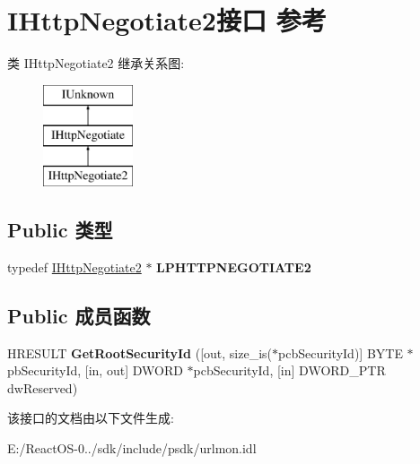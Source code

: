 \hypertarget{interface_i_http_negotiate2}{}\section{I\+Http\+Negotiate2接口 参考}
\label{interface_i_http_negotiate2}
类 I\+Http\+Negotiate2 继承关系图\+:\begin{figure}[H]
\begin{center}
\leavevmode
\includegraphics[height=3.000000cm]{interface_i_http_negotiate2}
\end{center}
\end{figure}
\subsection*{Public 类型}
\begin{DoxyCompactItemize}
\item 
\mbox{\label{interface_i_http_negotiate2_acd8bc7794efcb0cfc7467b2e1ddb85df}} 
typedef \hyperlink{interface_i_http_negotiate2}{I\+Http\+Negotiate2} $\ast$ {\bfseries L\+P\+H\+T\+T\+P\+N\+E\+G\+O\+T\+I\+A\+T\+E2}
\end{DoxyCompactItemize}
\subsection*{Public 成员函数}
\begin{DoxyCompactItemize}
\item 
\mbox{\label{interface_i_http_negotiate2_a1e20bc1021805613698332c745bde5eb}} 
H\+R\+E\+S\+U\+LT {\bfseries Get\+Root\+Security\+Id} (\mbox{[}out, size\+\_\+is($\ast$pcb\+Security\+Id)\mbox{]} B\+Y\+TE $\ast$pb\+Security\+Id, \mbox{[}in, out\mbox{]} D\+W\+O\+RD $\ast$pcb\+Security\+Id, \mbox{[}in\mbox{]} D\+W\+O\+R\+D\+\_\+\+P\+TR dw\+Reserved)
\end{DoxyCompactItemize}


该接口的文档由以下文件生成\+:\begin{DoxyCompactItemize}
\item 
E\+:/\+React\+O\+S-\/0../sdk/include/psdk/urlmon.\+idl\end{DoxyCompactItemize}

